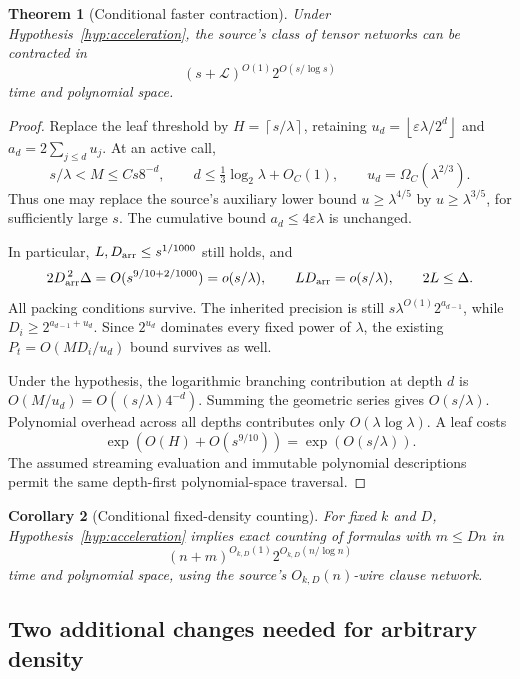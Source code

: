 \documentclass[11pt,letterpaper]{article}
\numberwithin{equation}{section}
\newtheorem{theorem}{Theorem}[section]
\newtheorem{corollary}[theorem]{Corollary}
\theoremstyle{definition}
\theoremstyle{remark}
\newcommand{\ceil}[1]{\left\lceil #1\right\rceil}
\newcommand{\floor}[1]{\left\lfloor #1\right\rfloor}
\begin{document}
\begin{theorem}[Conditional faster contraction]
\label{thm:conditional-contraction}
Under Hypothesis~\ref{hyp:acceleration}, the source's class of tensor
networks can be contracted in
\[
 (s+\mathcal L)^{O(1)}2^{O(s/\log s)}
\]
time and polynomial space.
\end{theorem}
\begin{proof}
Replace the leaf threshold by $H=\ceil{s/\lambda}$, retaining
$u_d=\floor{\varepsilon\lambda/2^d}$ and $a_d=2\sum_{j\le d}u_j$.
At an active call,
\[
 s/\lambda<M\le Cs8^{-d},\qquad
 d\le\tfrac13\log_2\lambda+O_C(1),\qquad
 u_d=\Omega_C(\lambda^{2/3}).
\]
Thus one may replace the source's auxiliary lower bound
$u\ge\lambda^{4/5}$ by $u\ge\lambda^{3/5}$, for sufficiently large $s$.
The cumulative bound $a_d\le4\varepsilon\lambda$ is unchanged.

In particular, $L,D_{\rm arr}\le s^{1/1000}$ still holds, and
\[
 2D_{\rm arr}^{\,2}\Delta=O(s^{9/10+2/1000})=o(s/\lambda),
 \qquad LD_{\rm arr}=o(s/\lambda),\qquad 2L\le\Delta.
\]
All packing conditions survive. The inherited precision is still
$s\lambda^{O(1)}2^{a_{d-1}}$, while
$D_i\ge2^{a_{d-1}+u_d}$. Since $2^{u_d}$ dominates every fixed power of
$\lambda$, the existing $P_t=O(MD_i/u_d)$ bound survives as well.

Under the hypothesis, the logarithmic branching contribution at depth $d$
is $O(M/u_d)=O((s/\lambda)4^{-d})$. Summing the geometric series gives
$O(s/\lambda)$. Polynomial overhead across all depths contributes only
$O(\lambda\log\lambda)$. A leaf costs
\[
 \exp(O(H)+O(s^{9/10}))=\exp(O(s/\lambda)).
\]
The assumed streaming evaluation and immutable polynomial descriptions
permit the same depth-first polynomial-space traversal.
\end{proof}

\begin{corollary}[Conditional fixed-density counting]
\label{cor:conditional-sparse}
For fixed $k$ and $D$, Hypothesis~\ref{hyp:acceleration} implies exact
counting of formulas with $m\le Dn$ in
\[
 (n+m)^{O_{k,D}(1)}2^{O_{k,D}(n/\log n)}
\]
time and polynomial space, using the source's $O_{k,D}(n)$-wire clause
network.
\end{corollary}

\subsection{Two additional changes needed for arbitrary density}
\end{document}
